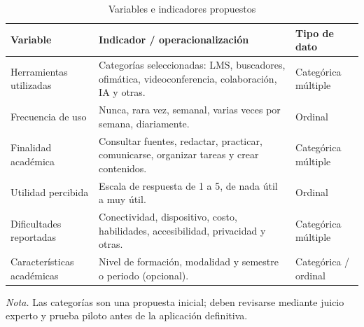 \begin{table}[H]
    \caption{Variables e indicadores propuestos}
    \label{tab:variables-indicadores}
    \begin{tabularx}{\textwidth}{
        >{\raggedright\arraybackslash}p{}
        >{\raggedright\arraybackslash}X
        >{\raggedright\arraybackslash}p{}
    }
        \toprule
        \textbf{Variable} &
        \textbf{Indicador / operacionalización} &
        \textbf{Tipo de dato} \\
        \midrule

        Herramientas utilizadas &
        Categorías seleccionadas: LMS, buscadores, ofimática, videoconferencia, colaboración, IA y otras. &
        Categórica múltiple \\

        Frecuencia de uso &
        Nunca, rara vez, semanal, varias veces por semana, diariamente. &
        Ordinal \\

        Finalidad académica &
        Consultar fuentes, redactar, practicar, comunicarse, organizar tareas y crear contenidos. &
        Categórica múltiple \\

        Utilidad percibida &
        Escala de respuesta de 1 a 5, de nada útil a muy útil. &
        Ordinal \\

        Dificultades reportadas &
        Conectividad, dispositivo, costo, habilidades, accesibilidad, privacidad y otras. &
        Categórica múltiple \\

        Características académicas &
        Nivel de formación, modalidad y semestre o periodo (opcional). &
        Categórica / ordinal \\
        \bottomrule
    \end{tabularx}

    \begin{minipage}{\textwidth}
        \footnotesize
        \textit{Nota.} Las categorías son una propuesta inicial; deben revisarse mediante juicio experto y prueba piloto antes de la aplicación definitiva.
    \end{minipage}
\end{table}
